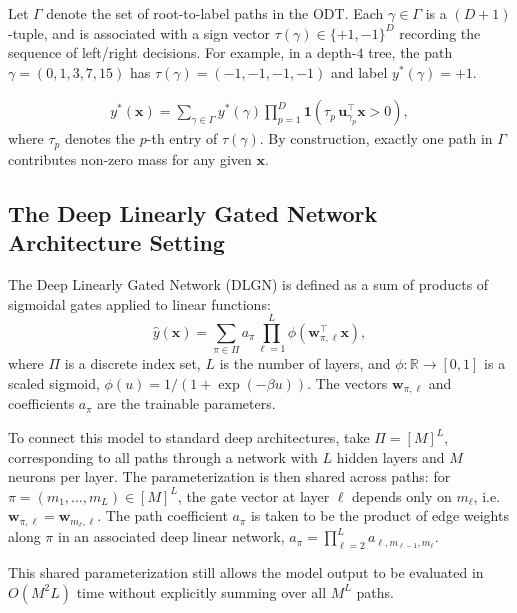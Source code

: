 \documentclass{article}
\theoremstyle{plain}
\theoremstyle{definition}
\theoremstyle{remark}
\newcommand{\R}{{\mathbb R}}
\newcommand{\1}{{\mathbf 1}}
\newcommand{\0}{{\mathbf 0}}
\newcommand{\w}{{\mathbf w}}
\newcommand{\x}{{\mathbf x}}
\newcommand{\bu}{{\mathbf u}}
\renewcommand{\>}{{\rightarrow}}
\begin{document}
Let $\Gamma$ denote the set of root-to-label paths in the ODT. Each $\gamma \in \Gamma$ is a $(D+1)$-tuple, and is associated with a sign vector $\tau(\gamma)\in\{+1,-1\}^D$ recording the sequence of left/right decisions. For example, in a depth-$4$ tree, the path $\gamma=(0,1,3,7,15)$ has $\tau(\gamma)=(-1,-1,-1,-1)$ and label $y^*(\gamma)=+1$.

\begin{equation}
\begin{aligned}
y^*(\x) = \sum_{\gamma \in \Gamma} y^*(\gamma)\prod_{p=1}^D \mathbf{1}\!\left(\tau_p \, \bu_{\gamma_p}^\top \x > 0\right),
\end{aligned}
\label{eqn:ODT_defn}
\end{equation}
where $\tau_p$ denotes the $p$-th entry of $\tau(\gamma)$. By construction, exactly one path in $\Gamma$ contributes non-zero mass for any given $\x$.

\subsection{The Deep Linearly Gated Network Architecture Setting}
\label{sec:DLGN_intro}

The Deep Linearly Gated Network (DLGN) is defined as a sum of products of sigmoidal gates applied to linear functions:
\begin{equation}
    \hat y(\x) = \sum_{\pi \in \Pi} a_\pi \prod_{\ell=1}^L \phi(\w_{\pi,\ell}^\top \x),
    \label{eq:DLGN_path_dec}
\end{equation}
where $\Pi$ is a discrete index set, $L$ is the number of layers, and $\phi:\R\to[0,1]$ is a scaled sigmoid, $\phi(u)=1/(1+\exp(-\beta u))$. The vectors $\w_{\pi,\ell}$ and coefficients $a_\pi$ are the trainable parameters.

To connect this model to standard deep architectures, \citet{Banerjee+25} take $\Pi=[M]^L$, corresponding to all paths through a network with $L$ hidden layers and $M$ neurons per layer. The parameterization is then shared across paths: for $\pi=(m_1,\ldots,m_L)\in[M]^L$, the gate vector at layer $\ell$ depends only on $m_\ell$, i.e. $\w_{\pi,\ell}=\w_{m_\ell,\ell}$. The path coefficient $a_\pi$ is taken to be the product of edge weights along $\pi$ in an associated deep linear network,
$
a_\pi = \prod_{\ell=2}^L a_{\ell,m_{\ell-1},m_\ell}.
$

This shared parameterization still allows the model output to be evaluated in $O(M^2L)$ time without explicitly summing over all $M^L$ paths.
\end{document}
